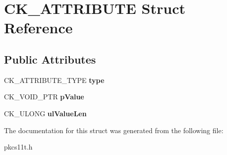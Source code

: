 \hypertarget{struct_c_k___a_t_t_r_i_b_u_t_e}{}\section{C\+K\+\_\+\+A\+T\+T\+R\+I\+B\+U\+TE Struct Reference}
\label{struct_c_k___a_t_t_r_i_b_u_t_e}
\subsection*{Public Attributes}
\begin{DoxyCompactItemize}
\item 
\mbox{\label{struct_c_k___a_t_t_r_i_b_u_t_e_a75f2e734f30124dfd27f53010affab07}} 
C\+K\+\_\+\+A\+T\+T\+R\+I\+B\+U\+T\+E\+\_\+\+T\+Y\+PE {\bfseries type}
\item 
\mbox{\label{struct_c_k___a_t_t_r_i_b_u_t_e_af96671d6383ed296ffcb7f7445790e6c}} 
C\+K\+\_\+\+V\+O\+I\+D\+\_\+\+P\+TR {\bfseries p\+Value}
\item 
\mbox{\label{struct_c_k___a_t_t_r_i_b_u_t_e_a645036d609793100f920d589b8d6d33b}} 
C\+K\+\_\+\+U\+L\+O\+NG {\bfseries ul\+Value\+Len}
\end{DoxyCompactItemize}


The documentation for this struct was generated from the following file\+:\begin{DoxyCompactItemize}
\item 
pkcs11t.\+h\end{DoxyCompactItemize}
